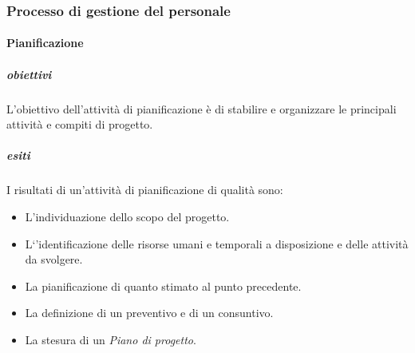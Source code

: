 \documentclass[../piano-di-qualifica.tex]{subfiles}
\begin{document}
\subsubsection{Processo di gestione del personale}%
\label{subs:processo_di_gestione_del_personale}

\paragraph{Pianificazione}%
\label{par:pianificazione}

\subparagraph{obiettivi}%
\label{subp:obiettivi}
L'obiettivo dell'attività di pianificazione è di stabilire e organizzare le principali attività e compiti di progetto.

\subparagraph{esiti}%
\label{subp:esiti}
I risultati di un'attività di pianificazione di qualità sono:
\begin{itemize}
	\item L'individuazione dello scopo del progetto.
	\item L`'identificazione delle risorse umani e temporali a disposizione e delle attività da svolgere.
	\item La pianificazione di quanto stimato al punto precedente.
	\item La definizione di un preventivo e di un consuntivo.
	\item La stesura di un \textit{Piano di progetto}.
\end{itemize}
\end{document}
